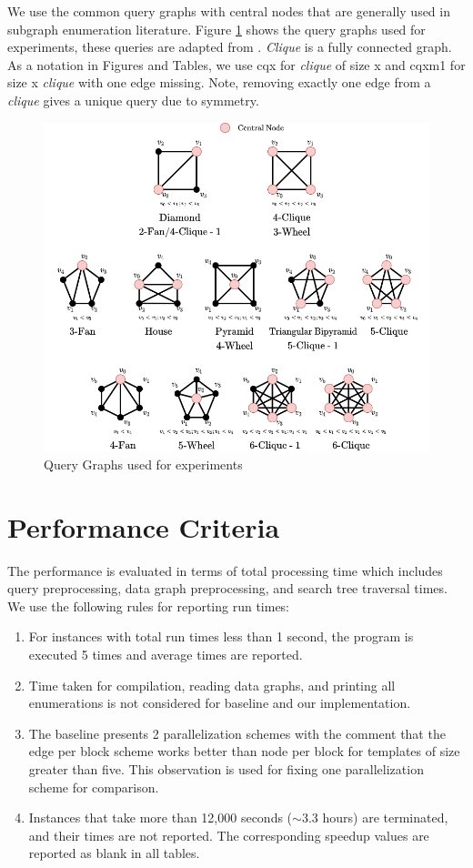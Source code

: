We use the common query graphs with central nodes that are generally used in subgraph enumeration literature.
Figure \ref{fig:queries} shows the query graphs used for experiments, these queries are adapted from \cite{PARSEC_VD}.
\textit{Clique} is a fully connected graph.
As a notation in Figures and Tables, we use cqx for \textit{clique} of size x and cqxm1 for size x \textit{clique} with one edge missing. Note, removing exactly one edge from a \textit{clique} gives a unique query due to symmetry.
\begin{figure}[t]
    \includegraphics[width=\textwidth]{fig/improvements/Templates.png}
    \caption{Query Graphs used for experiments}
    \label{fig:queries}
\end{figure}

\section{Performance Criteria}
The performance is evaluated in terms of total processing time which includes query preprocessing, data graph preprocessing, and search tree traversal times.
We use the following rules for reporting run times:\
\begin{enumerate}
    \item For instances with total run times less than 1 second, the program is executed 5 times and average times are reported.
    \item Time taken for compilation, reading data graphs, and printing all enumerations is not considered for baseline and our implementation.
    \item The baseline presents 2 parallelization schemes with the comment that the edge per block scheme works better than node per block for templates of size greater than five. This observation is used for fixing one parallelization scheme for comparison.
    \item Instances that take more than 12,000 seconds ($\sim 3.3$ hours) are terminated, and their times are not reported. The corresponding speedup values are reported as blank in all tables.
\end{enumerate}


